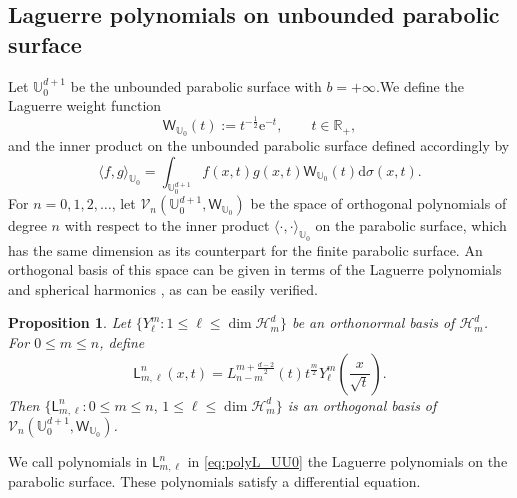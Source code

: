 \documentclass{amsart}
\newtheorem{prop}[thm]{Proposition}
\theoremstyle{remark}
\def\la{{\langle}}
\def\ra{{\rangle}}
\def\d{\mathrm{d}}
\def\e{\mathrm{e}}
\def\sph{{\mathbb{S}^{d-1}}}
\def\sb{{\mathsf b}}
\def\sh{{\mathsf h}}
\def\sL{{\mathsf L}}
\def\sP{{\mathsf P}}
\def\sQ{{\mathsf Q}}
\def\sW{{\mathsf W}}
\def\b{{\beta}}
\def\g{{\gamma}}
\def\o{{\omega}}
\def\s{\sigma}
\def\la{{\langle}}
\def\ra{{\rangle}}
\def\sb{{\mathbf s}}
\def\CH{{\mathcal H}}
\def\CV{{\mathcal V}}
\def\RR{{\mathbb R}}
\def\UU{{\mathbb U}}
\def\f{\frac}
\begin{document}
\subsection{Laguerre polynomials on unbounded parabolic surface} 
Let $\UU_0^{d+1}$ be the unbounded parabolic surface with $b = +\infty$.We define the Laguerre 
weight function 
$$
    \sW_{\UU_0} (t) := t^{-\f12} \e^{-t},  \qquad t \in \RR_+, 
$$
and the inner product on the unbounded parabolic surface defined accordingly by
$$
  \la f,g\ra_{\UU_0} = \int_{\UU_0^{d+1}} f(x,t) g(x,t) \sW_{\UU_0}(t) \d\s(x,t).
$$
For $n =0,1,2,\ldots$, let $\CV_n(\UU_0^{d+1}, \sW_{\UU_0})$ be the space of orthogonal polynomials of degree
$n$ with respect to the inner product $ \la \cdot, \cdot\ra_{\UU_0}$ on the parabolic surface, which has the same
dimension as its counterpart for the finite parabolic surface. An orthogonal basis of this space can be given
in terms of the Laguerre polynomials and spherical harmonics \cite{OX}, as can be easily verified. 

\begin{prop}
Let $\{Y_\ell^m: 1 \le \ell \le \dim \CH_m^d\}$ be an orthonormal basis of $\CH_m^d$. For $0 \le m \le n$, define  
\begin{equation} \label{eq:polyL_UU0}
   \sL_{m,\ell}^n(x,t) = L_{n-m}^{m +\frac{d-2}{2}}(t) t^{\f{m}{2}}Y_\ell^m\left(\f{x}{\sqrt{t}}\right). 
\end{equation}
Then $\{\sL_{m,\ell}^n: 0\le m \le n, \, 1 \le \ell \le \dim \CH_m^d\}$ is an orthogonal basis of 
$\CV_n(\UU_0^{d+1}, \sW_{\UU_0})$.  
\end{prop}

We call polynomials in $\sL_{m,\ell}^n$ in \eqref{eq:polyL_UU0} the Laguerre polynomials on the parabolic surface. 
These polynomials satisfy a differential equation. 
\end{document}
